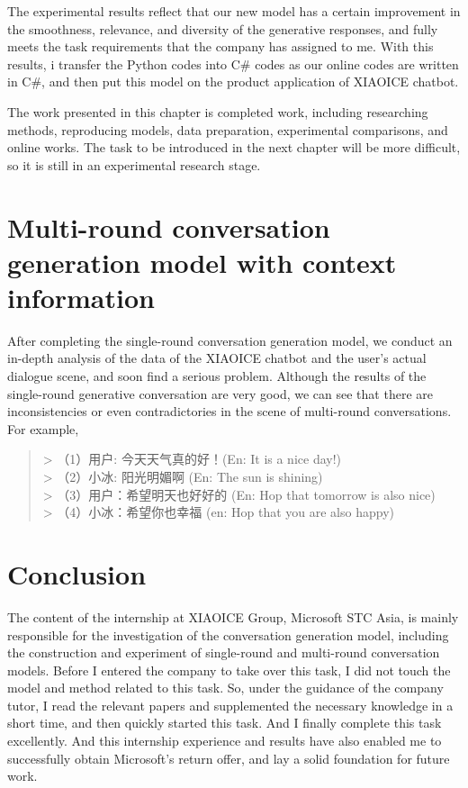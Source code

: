 \documentclass[12pt,a4paper]{article}
\begin{document}
The experimental results reflect that our new model has a certain improvement in the smoothness, relevance, and diversity of the generative responses, and fully meets the task requirements that the company has assigned to me. With this results, i transfer the Python codes into C\# codes as our online codes are written in C\#, and then put this model on the  product application of XIAOICE chatbot.

The work presented in this chapter is completed work, including researching methods, reproducing models, data preparation, experimental comparisons, and online works. The task to be introduced in the next chapter will be more difficult, so it is still in an experimental research stage.



\section{Multi-round conversation generation model with context information}

After completing the single-round conversation generation model, we conduct an in-depth analysis of the data of the XIAOICE chatbot and the user's actual dialogue scene, and soon find a serious problem. Although the results of the single-round generative conversation are very good, we can see that there are inconsistencies or even contradictories in the scene of multi-round conversations. For example,


\begin{quote}
> （1）用户: 今天天气真的好！(En: It is a nice day!) \\
> （2）小冰: 阳光明媚啊 (En: The sun is shining)\\
> （3）用户：希望明天也好好的 (En: Hop that tomorrow is also nice)\\
> （4）小冰：希望你也幸福 (en: Hop that you are also happy)
\end{quote}




\section{Conclusion}

The content of the internship at XIAOICE Group, Microsoft STC Asia, is mainly responsible for the investigation of the conversation generation model, including the construction and experiment of single-round and multi-round conversation models. Before I entered the company to take over this task, I did not touch the model and method related to this task. So, under the guidance of the company tutor, I read the relevant papers and supplemented the necessary knowledge in a short time, and then quickly started this task. And I finally complete this task excellently. And this internship experience and results have also enabled me to successfully obtain Microsoft's return offer, and lay a solid foundation for future work.
\end{document}
